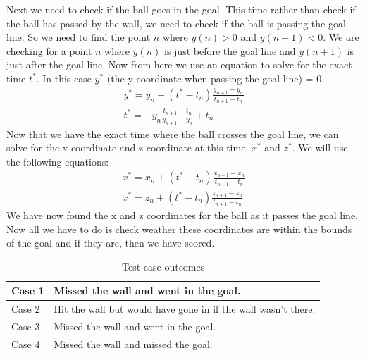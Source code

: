 \documentclass[12pt]{article}
\begin{document}
Next we need to check if the ball goes in the goal. This time rather than check if the ball has passed by the wall, we need to check if the ball is passing the goal line. So we need to find the point $n$ where $y(n) > 0$ and $y(n+1) < 0$. We are checking for a point $n$ where $y(n)$ is just before the goal line and $y(n+1)$ is just after the goal line. Now from here we use an equation to solve for the exact time $t^{*}$. In this case $y^{*}$ (the y-coordinate when passing the goal line) = 0.
\begin{eqnarray}
y^{*} = y_{n} + (t^{*} - t_{n})\frac{y_{n+1} - y_{n}}{t_{n+1} - t_{n}}\\\nonumber
t^{*} = -y_{n}\frac{t_{n+1} - t_{n}}{y_{n+1} - y_{n}} + t_{n}\nonumber
\end{eqnarray}
Now that we have the exact time where the ball crosses the goal line, we can solve for the x-coordinate and z-coordinate at this time, $x^{*}$ and $z^{*}$. We will use the following equations:
\begin{eqnarray}
x^{*} = x_{n} + (t^{*} - t_{n})\frac{x_{n+1} - x_{n}}{t_{n+1} - t_{n}}\\\nonumber
x^{*} = z_{n} + (t^{*} - t_{n})\frac{z_{n+1} - z_{n}}{t_{n+1} - t_{n}}\nonumber
\end{eqnarray}
We have now found the x and z coordinates for the ball as it passes the goal line. Now all we have to do is check weather these coordinates are within the bounds of the goal and if they are, then we have scored.\\

\begin{table}[htb]
\centering
\label{my-label}
\begin{tabular}{|l|l|}
\hline
Case 1 & Missed the wall and went in the goal.                         \\ \hline
Case 2 & Hit the wall but would have gone in if the wall wasn't there. \\ \hline
Case 3 & Missed the wall and went in the goal.                         \\ \hline
Case 4 & Missed the wall and missed the goal.                          \\ \hline
\end{tabular}
\caption{Test case outcomes}
\end{table}

\newpage
\clearpage
\setcounter{page}{1} \pagestyle{empty}
\end{document}
